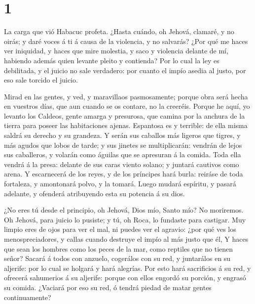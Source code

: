 \hypertarget{section}{%
\section{1}\label{section}}

 La carga que vió Habacuc profeta.  ¿Hasta
cuándo, oh Jehová, clamaré, y no oirás; y daré voces á ti á causa de la
violencia, y no salvarás?  ¿Por qué me haces ver iniquidad,
y haces que mire molestia, y saco y violencia delante de mí, habiendo
además quien levante pleito y contienda?  Por lo cual la ley
es debilitada, y el juicio no sale verdadero: por cuanto el impío asedia
al justo, por eso sale torcido el juicio.

 Mirad en las gentes, y ved, y maravillaos pasmosamente;
porque obra será hecha en vuestros días, que aun cuando se os contare,
no la creeréis.  Porque he aquí, yo levanto los Caldeos,
gente amarga y presurosa, que camina por la anchura de la tierra para
poseer las habitaciones ajenas.  Espantosa es y terrible: de
ella misma saldrá su derecho y su grandeza.  Y serán sus
caballos más ligeros que tigres, y más agudos que lobos de tarde; y sus
jinetes se multiplicarán: vendrán de lejos sus caballeros, y volarán
como águilas que se apresuran á la comida.  Toda ella vendrá
á la presa: delante de sus caras viento solano; y juntará cautivos como
arena.  Y escarnecerá de los reyes, y de los príncipes hará
burla: reiráse de toda fortaleza, y amontonará polvo, y la tomará.
 Luego mudará espíritu, y pasará adelante, y ofenderá
atribuyendo esta su potencia á su dios.

 ¿No eres tú desde el principio, oh Jehová, Dios mío, Santo
mío? No moriremos. Oh Jehová, para juicio lo pusiste; y tú, oh Roca, lo
fundaste para castigar.  Muy limpio eres de ojos para ver
el mal, ni puedes ver el agravio: ¿por qué ves los menospreciadores, y
callas cuando destruye el impío al más justo que él,  Y
haces que sean los hombres como los peces de la mar, como reptiles que
no tienen señor?  Sacará á todos con anzuelo, cogerálos con
su red, y juntarálos en su aljerife: por lo cual se holgará y hará
alegrías.  Por esto hará sacrificios á su red, y ofrecerá
sahumerios á su aljerife: porque con ellos engordó su porción, y engrasó
su comida.  ¿Vaciará por eso su red, ó tendrá piedad de
matar gentes continuamente?

